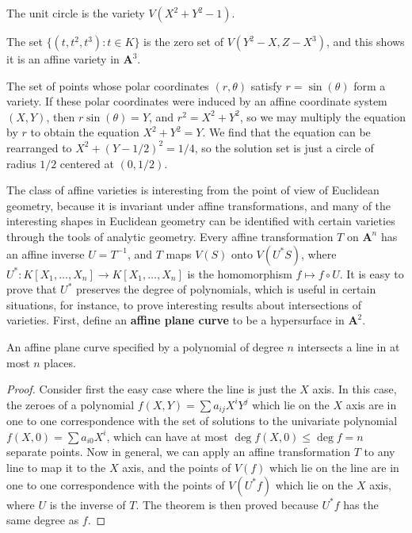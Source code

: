 \begin{example}
    The unit circle is the variety $V(X^2 + Y^2 - 1)$.
\end{example}

\begin{example}
    The set $\{ (t,t^2,t^3): t \in K \}$ is the zero set of $V(Y^2 - X, Z - X^3)$, and this shows it is an affine variety in $\mathbf{A}^3$.
\end{example}

\begin{example}
    The set of points whose polar coordinates $(r,\theta)$ satisfy $r = \sin(\theta)$ form a variety. If these polar coordinates were induced by an affine coordinate system $(X,Y)$, then $r \sin(\theta) = Y$, and $r^2 = X^2 + Y^2$, so we may multiply the equation by $r$ to obtain the equation $X^2 + Y^2 = Y$. We find that the equation can be rearranged to $X^2 + (Y-1/2)^2 = 1/4$, so the solution set is just a circle of radius $1/2$ centered at $(0,1/2)$.
\end{example}

The class of affine varieties is interesting from the point of view of Euclidean geometry, because it is invariant under affine transformations, and many of the interesting shapes in Euclidean geometry can be identified with certain varieties through the tools of analytic geometry. Every affine transformation $T$ on $\mathbf{A}^n$ has an affine inverse $U = T^{-1}$, and $T$ maps $V(S)$ onto $V(U^*S)$, where $U^*: K[X_1, \dots, X_n] \to K[X_1, \dots, X_n]$ is the homomorphism $f \mapsto f \circ U$. It is easy to prove that $U^*$ preserves the degree of polynomials, which is useful in certain situations, for instance, to prove interesting results about intersections of varieties. First, define an {\bf affine plane curve} to be a hypersurface in $\mathbf{A}^2$.

\begin{theorem}
    An affine plane curve specified by a polynomial of degree $n$ intersects a line in at most $n$ places.
\end{theorem}
\begin{proof}
    Consider first the easy case where the line is just the $X$ axis. In this case, the zeroes of a polynomial $f(X,Y) = \sum a_{ij} X^iY^j$ which lie on the $X$ axis are in one to one correspondence with the set of solutions to the univariate polynomial $f(X,0) = \sum a_{i0} X^i$, which can have at most $\deg f(X,0) \leq \deg f = n$ separate points. Now in general, we can apply an affine transformation $T$ to any line to map it to the $X$ axis, and the points of $V(f)$ which lie on the line are in one to one correspondence with the points of $V(U^*f)$ which lie on the $X$ axis, where $U$ is the inverse of $T$. The theorem is then proved because $U^* f$ has the same degree as $f$.
\end{proof}

